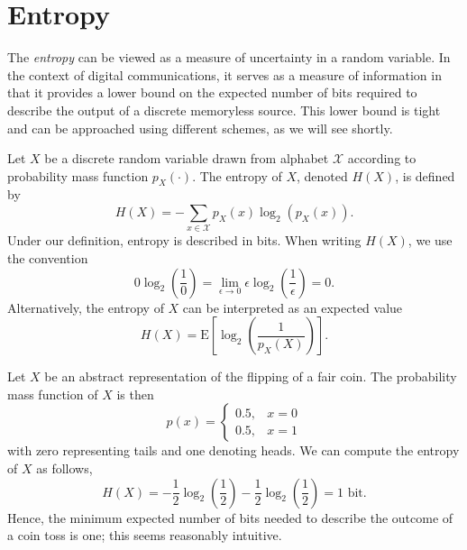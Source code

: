 \section{Entropy}

The \emph{entropy} can be viewed as a measure of uncertainty in a random variable.
In the context of digital communications, it serves as a measure of information in that it provides a lower bound on the expected number of bits required to describe the output of a discrete memoryless source.
This lower bound is tight and can be approached using different schemes, as we will see shortly.

\begin{definition}[Entropy]
Let $X$ be a discrete random variable drawn from alphabet $\mathcal{X}$ according to probability mass function $p_X(\cdot)$.
The entropy of $X$, denoted $H(X)$, is defined by
\begin{equation} \label{equation:Entropy}
H(X) = - \sum_{x \in \mathcal{X}} p_X (x) \log_2 ( p_X(x) ) .
\end{equation}
Under our definition, entropy is described in bits.
When writing $H(X)$, we use the convention
\begin{equation*}
0 \log_2 \left( \frac{1}{0} \right)
= \lim_{\epsilon \rightarrow 0} \epsilon \log_2 \left( \frac{1}{\epsilon} \right)
= 0 .
\end{equation*}
Alternatively, the entropy of $X$ can be interpreted as an expected value
\begin{equation*}
H(X) = \mathrm{E} \left[ \log_2 \left( \frac{1}{p_X(X)} \right) \right] .
\end{equation*}
\end{definition}

\begin{example} \label{example:EntropyFairCoin}
Let $X$ be an abstract representation of the flipping of a fair coin.
The probability mass function of $X$ is then
\begin{equation*}
p(x) = \begin{cases} 0.5, & x = 0 \\
0.5, & x = 1 \end{cases}
\end{equation*}
with zero representing tails and one denoting heads.
We can compute the entropy of $X$ as follows,
\begin{equation*}
H(X) = - \frac{1}{2} \log_2 \left( \frac{1}{2} \right)
- \frac{1}{2} \log_2 \left( \frac{1}{2} \right) = 1 \text{ bit.}
\end{equation*}
Hence, the minimum expected number of bits needed to describe the outcome of a coin toss is one; this seems reasonably intuitive.
\end{example}

